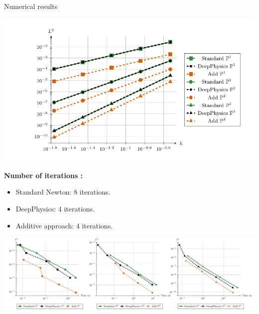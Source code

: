 \begin{frame}{Numerical results}	
    \vspace{-10pt}
    \begin{center}
        \begin{minipage}{0.54\linewidth}
            \includegraphics[width=\linewidth]{images/newlines/nonlinear/results/cvg_cropped.pdf}
        \end{minipage}
        \begin{minipage}{0.42\linewidth}
            \small
            \textbf{Number of iterations :}

            \begin{itemize}
                \item Standard Newton: $8$ iterations.
                \item DeepPhysics: $4$ iterations.
                \item Additive approach: $4$ iterations.
            \end{itemize}
        \end{minipage}
        
        \vspace{-6pt}
        \includegraphics[width=\linewidth]{images/newlines/nonlinear/results/times.pdf}
    \end{center}
\end{frame}